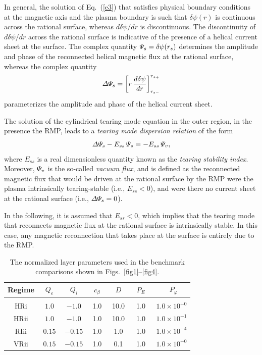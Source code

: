 \documentclass[12pt,prb,aps]{revtex4-1}
\begin{document}
In general, the solution of Eq.~(\ref{e3}) that satisfies physical
boundary conditions at the magnetic axis and the plasma boundary is such that $\delta\psi(r)$ is continuous
across the rational surface, whereas $d\delta\psi/dr$ is discontinuous. The discontinuity of
 $d\delta\psi/dr$ across the rational surface is indicative of the presence of a helical current
 sheet at the surface.  The complex quantity ${\mit\Psi}_s= \delta\psi(r_s)$ determines the amplitude
 and phase of the reconnected helical magnetic flux at the rational surface, whereas the complex quantity 
 \begin{equation}
{\mit\Delta\Psi}_{\!s} = \left[r\,\frac{d\delta\psi}{dr}\right]_{r_{s-}}^{r_{s+}}
\end{equation}
parameterizes the amplitude and phase of the helical current sheet.\cite{rf1993}

The solution of
the cylindrical tearing mode equation in the outer region, in the presence the RMP,  leads to a {\em tearing mode dispersion relation}\/ of the form\,\cite{rf1993,fkr}
\begin{equation}\label{e110}
{\mit\Delta\Psi}_{\!s}- E_{ss}\,{\mit\Psi}_s = -E_{ss}\,{\mit\Psi}_v,
\end{equation}
where $E_{ss}$ is a real dimensionless quantity known as the {\em tearing stability index}.\cite{fkr} Moreover,
${\mit\Psi}_v$ is the so-called {\em vacuum flux}, and is defined as the reconnected magnetic flux
that would be driven at the rational surface by the RMP were the
plasma intrinsically tearing-stable (i.e., $E_{ss} <0$), and were there no current sheet at the rational surface
(i.e., ${\mit\Delta\Psi}_{\!s}=0$).\cite{rf1993} 

In the following, it is assumed that $E_{ss}<0$, which implies that the tearing mode that
reconnects magnetic flux at the rational surface is intrinsically stable. In this case, any magnetic reconnection that takes place at the
surface is entirely due to the RMP. 

\begin{table}[t]
\centering
\begin{tabular}{ccccccc}
\hline
Regime & ~$Q_e$~ & ~$Q_i$~ & ~$c_\beta$~ & ~$D$~ & ~$P_E$~ & ~$P_\varphi$\\[0.5ex]\hline
&&&&&&\\[-2ex]
HRi  & $1.0$  & $-1.0$  &1.0  &10.0 & 1.0 & $1.0\times 10^{+0}$\\[0.5ex]
HRii & $1.0$  & $-1.0$  & 1.0 & 10.0& 1.0 & $1.0\times 10^{-1}$\\[0.5ex]
RIii   & $0.15$ & $-0.15$ &1.0 & 1.0 & 1.0 & $1.0\times 10^{-4}$\\[0.5ex]
VRii & $0.15$ & $-0.15$ &1.0 & 0.1& 1.0 & $1.0\times 10^{+0}$
\end{tabular}
\caption{The normalized layer parameters used in the benchmark comparisons shown in Figs.~\ref{fig1}--\ref{fig4}. }\label{t1}
\end{table}
\end{document}
